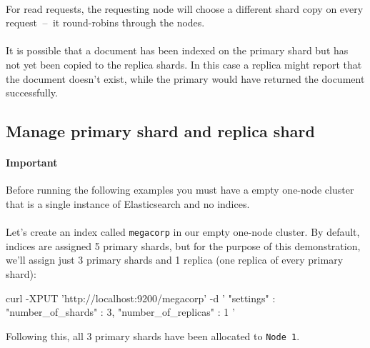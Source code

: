 \documentclass{article}%
\begin{document}
\paragraph{} For read requests, the requesting node will choose a different shard copy on every request  --  it round-robins through the nodes.

\paragraph{} It is possible that a document has been indexed on the primary shard but has not yet been copied to the replica shards. In this case a replica might report that the document doesn’t exist, while the primary would have returned the document successfully.

\subsection{Manage primary shard and replica shard}

\paragraph{Important} Before running the following examples you must have a empty one-node cluster that is a single instance of Elasticsearch and no indices.

\paragraph{} Let’s create an index called \texttt{megacorp} in our empty one-node cluster. By default, indices are assigned 5 primary shards, but for the purpose of this demonstration, we’ll assign just 3 primary shards and 1 replica (one replica of every primary shard):

\begin{command}
curl -XPUT 'http://localhost:9200/megacorp' -d '
{
	"settings" : {
		"number_of_shards" : 3,
		"number_of_replicas" : 1
	}
}'
\end{command}

Following this, all 3 primary shards have been allocated to \texttt{Node 1}.
\end{document}
